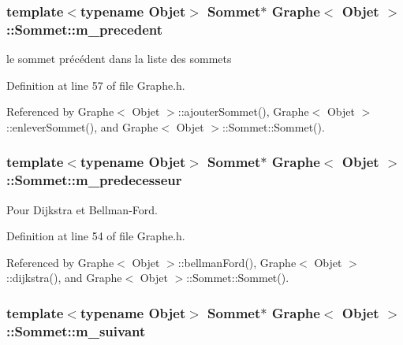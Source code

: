 \hypertarget{class_graphe_1_1_sommet_ab2a172434d603dd488664049764f8ddc}{
\subsubsection[{m\_\-precedent}]{\setlength{\rightskip}{0pt plus 5cm}template$<$typename Objet$>$ {\bf Sommet}$\ast$ {\bf Graphe}$<$ Objet $>$::{\bf Sommet::m\_\-precedent}}}
\label{class_graphe_1_1_sommet_ab2a172434d603dd488664049764f8ddc}


le sommet précédent dans la liste des sommets 



Definition at line 57 of file Graphe.h.



Referenced by Graphe$<$ Objet $>$::ajouterSommet(), Graphe$<$ Objet $>$::enleverSommet(), and Graphe$<$ Objet $>$::Sommet::Sommet().

\hypertarget{class_graphe_1_1_sommet_ad7ba92f37fbdc082f0582e8d9e6783d5}{
\subsubsection[{m\_\-predecesseur}]{\setlength{\rightskip}{0pt plus 5cm}template$<$typename Objet$>$ {\bf Sommet}$\ast$ {\bf Graphe}$<$ Objet $>$::{\bf Sommet::m\_\-predecesseur}}}
\label{class_graphe_1_1_sommet_ad7ba92f37fbdc082f0582e8d9e6783d5}


Pour Dijkstra et Bellman-\/Ford. 



Definition at line 54 of file Graphe.h.



Referenced by Graphe$<$ Objet $>$::bellmanFord(), Graphe$<$ Objet $>$::dijkstra(), and Graphe$<$ Objet $>$::Sommet::Sommet().

\hypertarget{class_graphe_1_1_sommet_a2c2fae1f10bccddf92cb95a3b6ecbb36}{
\subsubsection[{m\_\-suivant}]{\setlength{\rightskip}{0pt plus 5cm}template$<$typename Objet$>$ {\bf Sommet}$\ast$ {\bf Graphe}$<$ Objet $>$::{\bf Sommet::m\_\-suivant}}}
\label{class_graphe_1_1_sommet_a2c2fae1f10bccddf92cb95a3b6ecbb36}



